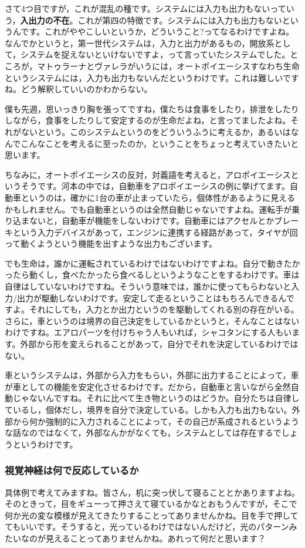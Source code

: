 \documentclass{ltjsbook}
\begin{document}
さて4つ目ですが，これが混乱の種です。システムには入力も出力もないっていう，\textbf{入出力の不在}。これが第四の特徴です。システムには入力も出力もないというんです。これがややこしいというか，どういうこと?ってなるわけですよね。なんでかというと，第一世代システムは，入力と出力があるもの，開放系として，システムを捉えないといけないですよ，って言っていたシステムでした。ところが，マトゥラーナとヴァレラがいうには，オートポイエーシスすなわち生命というシステムには，入力も出力もないんだというわけです。これは難しいですね。どう解釈していいのかわからない。

僕も先週，思いっきり胸を張ってですね，僕たちは食事をしたり，排泄をしたりしながら，食事をしたりして安定するのが生命だよね，と言ってましたよね。それがないという。このシステムというのをどういうふうに考えるか，あるいはなんでこんなことを考えるに至ったのか，ということをちょっと考えていきたいと思います。

ちなみに，オートポイエーシスの反対，対義語を考えると，アロポイエーシスというそうです。河本の中では，自動車をアロポイエーシスの例に挙げてます。自動車というのは，確かに1台の車が止まっていたら，個体性があるように見えるかもしれません。でも自動車というのは全然自動じゃないですよね。運転手が乗り込まないと，自動車が機能をしないわけです。自動車にはアクセルとかブレーキという入力デバイスがあって，エンジンに連携する経路があって，タイヤが回って動くようという機能を出すような出力もございます。

でも生命は，誰かに運転されているわけではないわけですよね。自分で動きたかったら動くし，食べたかったら食べるしというようなことをするわけです。車は自律はしていないわけですね。そういう意味では，誰かに使ってもらわないと入力/出力が駆動しないわけです。安定して走るということはもちろんできるんですよ。それにしても，入力とか出力というのを駆動してくれる別の存在がいる。さらに，車というのは境界の自己決定をしているかというと，そんなことはないわけですね。エアロパーツを付けちゃう人もいれば，シャコタンにする人もいます。外部から形を変えられることがあって，自分でそれを決定しているわけではない。

車というシステムは，外部から入力をもらい，外部に出力することによって，車が車としての機能を安定化させるわけです。だから，自動車と言いながら全然自動じゃないんですね。それに比べて生き物というのはどうか。自分たちは自律しているし，個体だし，境界を自分で決定している。しかも入力も出力もない。外部から何か強制的に入力されることによって，その自己が系成されるというような話なのではなくて，外部なんかがなくても，システムとしては存在するでしょうというわけです。

\subsubsection{視覚神経は何で反応しているか}
具体例で考えてみますね。皆さん，机に突っ伏して寝ることとかありますよね。そのときって，目をギューって押さえて寝ているかなとおもうんですが，そこで何か光の変な模様が見えてきたりすることってありませんかね。目を手で押しててもいいです。そうすると，光っているわけではないんだけど，光のパターンみたいなのが見えることってありませんかね。あれって何だと思います？
\end{document}
